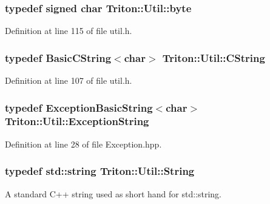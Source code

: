 \subsubsection[{byte}]{\setlength{\rightskip}{0pt plus 5cm}typedef signed char {\bf Triton\+::\+Util\+::byte}}\label{namespace_triton_1_1_util_ad57cf95b37eb5579968c3bef61027c29}


Definition at line 115 of file util.\+h.

\hypertarget{namespace_triton_1_1_util_aae040a6f7915195279abca47c7d72175}{}
\subsubsection[{C\+String}]{\setlength{\rightskip}{0pt plus 5cm}typedef {\bf Basic\+C\+String}$<$char$>$ {\bf Triton\+::\+Util\+::\+C\+String}}\label{namespace_triton_1_1_util_aae040a6f7915195279abca47c7d72175}


Definition at line 107 of file util.\+h.

\hypertarget{namespace_triton_1_1_util_a7e55ae91d6ccf98a52870cf7b7648eb7}{}
\subsubsection[{Exception\+String}]{\setlength{\rightskip}{0pt plus 5cm}typedef {\bf Exception\+Basic\+String}$<$char$>$ {\bf Triton\+::\+Util\+::\+Exception\+String}}\label{namespace_triton_1_1_util_a7e55ae91d6ccf98a52870cf7b7648eb7}


Definition at line 28 of file Exception.\+hpp.

\hypertarget{namespace_triton_1_1_util_ab36ffddebe19fdd103ec60af3841d9e2}{}
\subsubsection[{String}]{\setlength{\rightskip}{0pt plus 5cm}typedef std\+::string {\bf Triton\+::\+Util\+::\+String}}\label{namespace_triton_1_1_util_ab36ffddebe19fdd103ec60af3841d9e2}


A standard C++ string used as short hand for std\+::string. 



